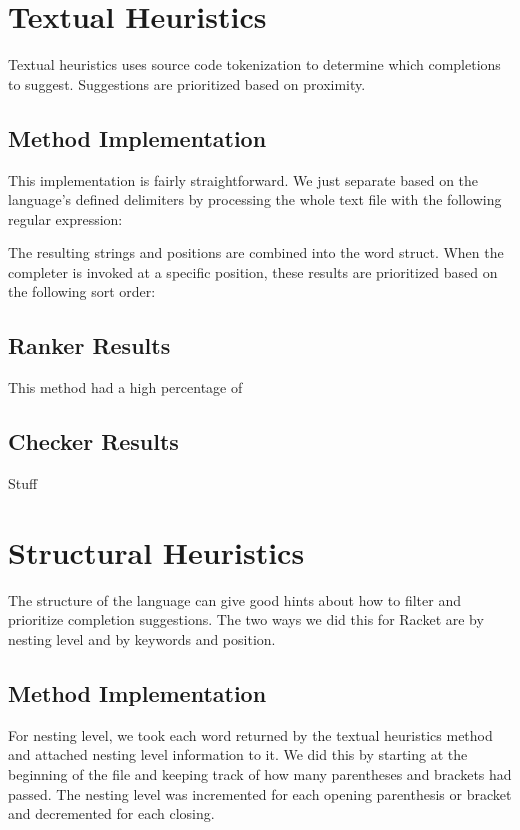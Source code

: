 \documentclass[ms,electronic,twosidetoc,letterpaper,chaptercenter,parttop,lol,lof,lot]{byumsphd}
\begin{document}
\section{Textual Heuristics}

Textual heuristics uses source code tokenization to determine which completions to suggest. Suggestions are prioritized based on proximity.

\subsection{Method Implementation}

This implementation is fairly straightforward. We just separate based on the language's defined delimiters by processing the whole text file with the following regular expression: \scheme{[^\s()[]",'`#|\;]+}

The resulting strings and positions are combined into the word struct. When the completer is invoked at a specific position, these results are prioritized based on the following sort order:


\subsection{Ranker Results}

This method had a high percentage of

\subsection{Checker Results}

Stuff

\section{Structural Heuristics}

The structure of the language can give good hints about how to filter and prioritize completion suggestions. The two ways we did this for Racket are by nesting level and by keywords and position.

\subsection{Method Implementation}

For nesting level, we took each word returned by the textual heuristics method and attached nesting level information to it. We did this by starting at the beginning of the file and keeping track of how many parentheses and brackets had passed. The nesting level was incremented for each opening parenthesis or bracket and decremented for each closing.
\end{document}

